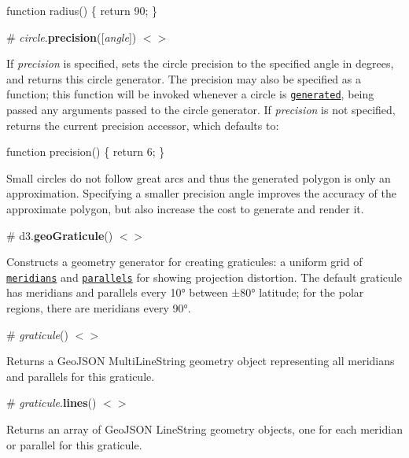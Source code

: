 \begin{DoxyCode}
function radius() \{
  return 90;
\}
\end{DoxyCode}


\label{_circle_precision}%
\# {\itshape circle}.{\bfseries precision}(\mbox{[}{\itshape angle}\mbox{]}) \href{https://github.com/d3/d3-geo/blob/master/src/circle.js#L67}{\tt $<$$>$}

If {\itshape precision} is specified, sets the circle precision to the specified angle in degrees, and returns this circle generator. The precision may also be specified as a function; this function will be invoked whenever a circle is \href{#_circle}{\tt generated}, being passed any arguments passed to the circle generator. If {\itshape precision} is not specified, returns the current precision accessor, which defaults to\+:


\begin{DoxyCode}
function precision() \{
  return 6;
\}
\end{DoxyCode}


Small circles do not follow great arcs and thus the generated polygon is only an approximation. Specifying a smaller precision angle improves the accuracy of the approximate polygon, but also increase the cost to generate and render it.

\label{_geoGraticule}%
\# d3.{\bfseries geo\+Graticule}() \href{https://github.com/d3/d3-geo/blob/master/src/graticule.js}{\tt $<$$>$}

Constructs a geometry generator for creating graticules\+: a uniform grid of \href{https://en.wikipedia.org/wiki/Meridian_\(geography\)}{\tt meridians} and \href{https://en.wikipedia.org/wiki/Circle_of_latitude}{\tt parallels} for showing projection distortion. The default graticule has meridians and parallels every 10° between ±80° latitude; for the polar regions, there are meridians every 90°.



\label{__graticule}%
\# {\itshape graticule}() \href{https://github.com/d3/d3-geo/blob/master/src/graticule.js#L21}{\tt $<$$>$}

Returns a Geo\+J\+S\+ON Multi\+Line\+String geometry object representing all meridians and parallels for this graticule.

\label{_graticule_lines}%
\# {\itshape graticule}.{\bfseries lines}() \href{https://github.com/d3/d3-geo/blob/master/src/graticule.js#L32}{\tt $<$$>$}

Returns an array of Geo\+J\+S\+ON Line\+String geometry objects, one for each meridian or parallel for this graticule.

